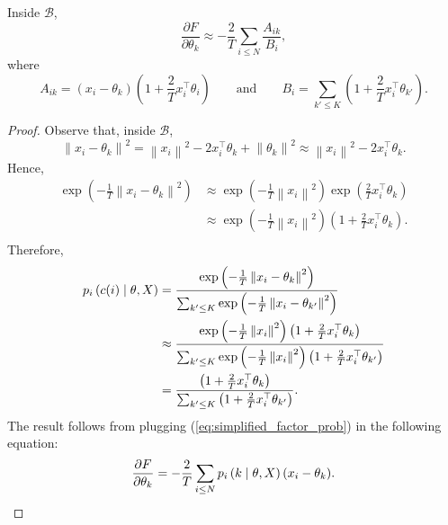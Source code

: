 \begin{lemma}
Inside $\mathcal{B}$,
%
\begin{equation}
\frac{\partial F}{\partial \theta_k} \approx -\frac{2}{T}\sum_{i \leq N} \frac{A_{ik}}{B_i},
\end{equation}
%
where
%
\begin{equation}
A_{ik} = (x_i - \theta_k)\left(1 + \frac{2}{T}x_i^\top \theta_i\right) \qquad \text{and} \qquad B_i = \sum_{k' \leq K}\left(1 + \frac{2}{T}x_i^\top \theta_{k'}\right).
\end{equation}
%
\label{lem:approx_deriv}
\end{lemma}

\begin{proof}
Observe that, inside $\mathcal{B}$,
%
\begin{equation}
\left\|x_i - \theta_k\right\|^2 = \left\|x_i\right\|^2 - 2x_i^\top\theta_k + \left\|\theta_k\right\|^2 \approx \left\|x_i\right\|^2 - 2x_i^\top \theta_k.
\end{equation}
%
Hence,
%
\begin{align}
\exp\left(- \frac{1}{T}\left\|x_i - \theta_k\right\|^2\right) &\approx \exp\left(-\frac{1}{T}\left\|x_i\right\|^2\right)\exp\left(\frac{2}{T}x_i^\top \theta_k\right)\\
&\approx \exp\left(-\frac{1}{T}\left\|x_i\right\|^2\right)\left(1 + \frac{2}{T}x_i^\top \theta_k\right).\\
\end{align}
%
Therefore,
%
\begin{align}
p_{i} \left(c(i)\mid \theta, X\right) &= \frac{\exp\left(-\frac{1}{T}\left\|x_i - \theta_k\right\|^2\right)}{\sum_{k' \leq K}\exp\left(-\frac{1}{T}\left\|x_i - \theta_{k'}\right\|^2\right)}\\
&\approx \frac{\exp\left(-\frac{1}{T}\left\|x_i\right\|^2\right)\left(1 + \frac{2}{T}x_i^\top \theta_k\right)}{\sum_{k' \leq K}\exp\left(-\frac{1}{T}\left\|x_i\right\|^2\right)\left(1 + \frac{2}{T}x_i^\top \theta_{k'}\right)}\\
&= \frac{\left(1 + \frac{2}{T}x_i^\top \theta_{k}\right)}{\sum_{k' \leq K}\left(1 + \frac{2}{T}x_i^\top \theta_{k'}\right)}.\label{eq:simplified_factor_prob}
\end{align}
%
The result follows from plugging (\ref{eq:simplified_factor_prob}) in the following equation:
%
\begin{equation}
\frac{\partial F}{\partial \theta_k} = - \frac{2}{T} \sum_{i \leq N} p_{i} \left(k\mid \theta, X\right)(x_i - \theta_k).
\label{eq:start_eq_da}
\end{equation}
%
\end{proof}

